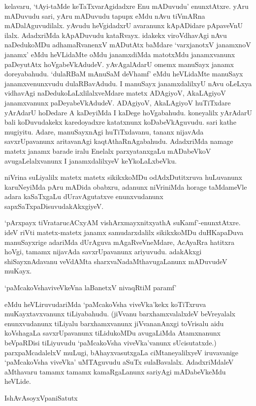 kelavaru, `tAyi-taMde keTaTxvarAgidadxre Enu mADuvudu' enunxtAtxre. yAru mADuvudu sari, yAru mADuvudu tapupx eMdu nAvu tiVmARna mADalAguvudilalx. yAvudu heVgidadxrU avaranunx kApADidare pApaveVnU ilalx. AdadxriMda kApADuvudu kataRvayx. idakekx viroVdhavAgi nAvu naDedukoMDu adhamaRvanenxV mADutAtx baMdare `varxjanotxV janamxnoV janamx' eMdu heVLidaMte oMdu janamxdiMda matotxMdu janamxvanunx paDeyutAtx hoVgabeVkAdudeV. yAvAgalAdarU omemx manuSayx janamx doreyabahudu. `dulaRBaM mAnuSaM deVhamf' eMdu heVLidaMte manuSayx janamxvenunxvudu dulaRBavAdudu. I manuSayx janamxdalilxyU nAvu oLeLxya vidhavAgi naDedukoLaLxlilalxveMdare matetx ADAgiyoV, AkaLAgiyoV janamxvanunx paDeyabeVkAdudeV. ADAgiyoV, AkaLAgiyoV huTiTxdare yArAdarU hoDedare A kaDeyiMda I kaDege hoVgabahudu. koneyalilx yArAdarU bali koDuvudakekx karedoyadxre katatxnunx koDabeVkAguvudu. sari kathe mugiyitu. Adare, manuSayxnAgi huTiTxdavanu, tananx nijavAda savxrUpavanunx aritavanAgi kaqtAthaRnAgabahudu. AdadxriMda namage matetx janamx barade iralu Enelalx parxyatanxgaLu mADabeVkoV avugaLelalxvanunx I janamxdalilxyeV keYkoLaLxbeVku.

niVrina suLiyalilx matetx matetx sikikxkoMDu odAdxDutitxruva huLuvanunx karuNeyiMda pAru mADida obabxru, adanunx niVriniMda horage taMdameVle adara kaSaTxgaLu dUravAgutatxve enunxvudanunx sapxSaTxpaDisuvudakAkxgiyeV.

`pArxpayx tiVratarucACxyAM vishArxmayxnitxyathA suKamf'-enunxtAtxre. ideV riVti matetx-matetx janamx samudarxdalilx sikikxkoMDu duHKapaDuva manuSayxrige adariMda dUrAguva mAgaRveVneMdare, AcAyaRra hatitxra hoVgi, tamamx nijavAda savxrUpavanunx ariyuvudu. adakAkxgi shiSayxnAdavanu veVdAMta sharxvaNadaMthavugaLanunx mADuvudeV muKayx.

\begin{shloka}
`paMcakoVshaviveVkeVna laBanetxV nivaqRtiM paramf'
\end{shloka}

eMdu heVLiruvudariMda `paMcakoVsha viveVka'kekx koTiTxruva muKayxtavxvanunx tiLiyabahudu. (jiVvanu barxhamxvalalxdeV beVreyalalx enunxvudanunx tiLiyalu barxhamxvanunx jiVvananAnxgi toVrisalu aidu koVshagaLa savxrUpavanunx tiLidukoMDu avugaLiMda Atamxnanunx beVpaRDisi tiLiyuvudu `paMcakoVsha viveVka'vanunx sUcisutatxde.) parxpaMcadalelxV muLugi, bAhayxvasutxgaLa ciMtaneyalilxyeV iruvavanige `paMcakoVsha viveVka' uMTAguvudu aSuTx sulaBavalalx. AdadxriMdaleV aMthavaru tamamx tamamx kamaRgaLanunx sariyAgi mADabeVkeMdu heVLide.

IshAvAsoyxVpaniSatutx

